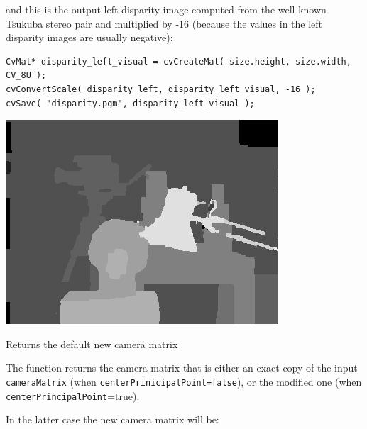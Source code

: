 and this is the output left disparity image computed from the well-known Tsukuba stereo pair and multiplied by -16 (because the values in the left disparity images are usually negative): 

\begin{lstlisting}
CvMat* disparity_left_visual = cvCreateMat( size.height, size.width, CV_8U );
cvConvertScale( disparity_left, disparity_left_visual, -16 );
cvSave( "disparity.pgm", disparity_left_visual );
\end{lstlisting}

\includegraphics{pics/disparity.png}

\fi

\ifCpp
{}
Returns the default new camera matrix

\begin{description}
\end{description}

The function returns the camera matrix that is either an exact copy of the input \texttt{cameraMatrix} (when \texttt{centerPrinicipalPoint=false}), or the modified one (when \texttt{centerPrincipalPoint}=true).

In the latter case the new camera matrix will be:

